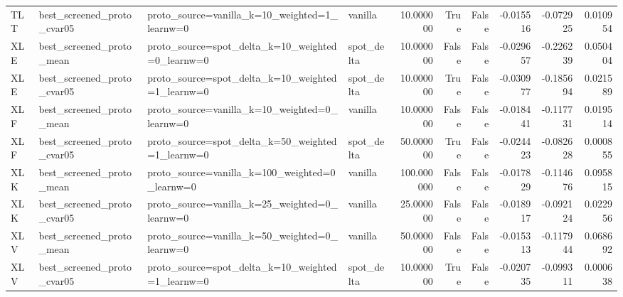\begin{tabular}{llllrrrrrr}
TLT & best\_screened\_proto\_cvar05 & proto\_source=vanilla\_k=10\_weighted=1\_learnw=0 & vanilla & 10.000000 & True & False & -0.015516 & -0.072925 & 0.010954 \\
XLE & best\_screened\_proto\_mean & proto\_source=spot\_delta\_k=10\_weighted=0\_learnw=0 & spot\_delta & 10.000000 & False & False & -0.029657 & -0.226239 & 0.050404 \\
XLE & best\_screened\_proto\_cvar05 & proto\_source=spot\_delta\_k=10\_weighted=1\_learnw=0 & spot\_delta & 10.000000 & True & False & -0.030977 & -0.185694 & 0.021589 \\
XLF & best\_screened\_proto\_mean & proto\_source=vanilla\_k=10\_weighted=0\_learnw=0 & vanilla & 10.000000 & False & False & -0.018441 & -0.117731 & 0.019514 \\
XLF & best\_screened\_proto\_cvar05 & proto\_source=spot\_delta\_k=50\_weighted=1\_learnw=0 & spot\_delta & 50.000000 & True & False & -0.024423 & -0.082628 & 0.000855 \\
XLK & best\_screened\_proto\_mean & proto\_source=vanilla\_k=100\_weighted=0\_learnw=0 & vanilla & 100.000000 & False & False & -0.017829 & -0.114676 & 0.095815 \\
XLK & best\_screened\_proto\_cvar05 & proto\_source=vanilla\_k=25\_weighted=0\_learnw=0 & vanilla & 25.000000 & False & False & -0.018917 & -0.092124 & 0.022956 \\
XLV & best\_screened\_proto\_mean & proto\_source=vanilla\_k=50\_weighted=0\_learnw=0 & vanilla & 50.000000 & False & False & -0.015313 & -0.117944 & 0.068692 \\
XLV & best\_screened\_proto\_cvar05 & proto\_source=spot\_delta\_k=10\_weighted=1\_learnw=0 & spot\_delta & 10.000000 & True & False & -0.020735 & -0.099311 & 0.000638 \\
\bottomrule
\end{tabular}
